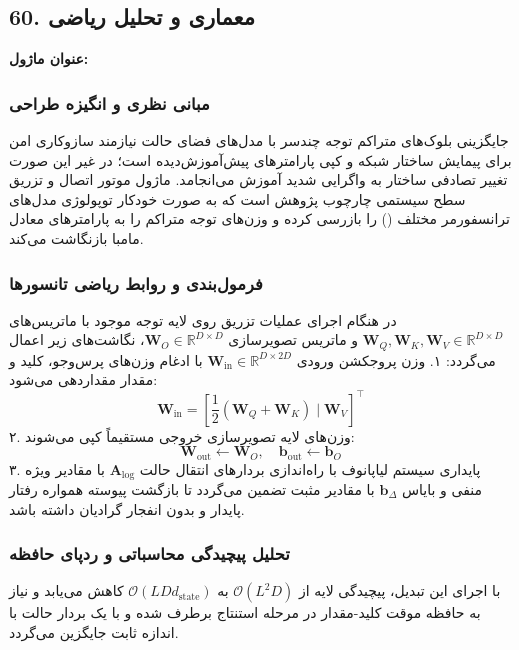 \subsection*{60. معماری و تحلیل ریاضی }
\textbf{عنوان ماژول:} 

\subsubsection*{مبانی نظری و انگیزه طراحی}
جایگزینی بلوک‌های متراکم توجه چندسر با مدل‌های فضای حالت نیازمند سازوکاری امن برای پیمایش ساختار شبکه و کپی پارامترهای پیش‌آموزش‌دیده است؛ در غیر این صورت تغییر تصادفی ساختار به واگرایی شدید آموزش می‌انجامد. ماژول  موتور اتصال و تزریق سطح سیستمی چارچوب پژوهش است که به صورت خودکار توپولوژی مدل‌های ترانسفورمر مختلف () را بازرسی کرده و وزن‌های توجه متراکم را به پارامترهای معادل مامبا بازنگاشت می‌کند.

\subsubsection*{فرمول‌بندی و روابط ریاضی تانسورها}
در هنگام اجرای عملیات تزریق روی لایه توجه موجود با ماتریس‌های $\mathbf{W}_Q, \mathbf{W}_K, \mathbf{W}_V \in \mathbb{R}^{D \times D}$ و ماتریس تصویرسازی $\mathbf{W}_O \in \mathbb{R}^{D \times D}$، نگاشت‌های زیر اعمال می‌گردد:
۱. وزن پروجکشن ورودی $\mathbf{W}_{\text{in}} \in \mathbb{R}^{D \times 2D}$ با ادغام وزن‌های پرس‌وجو، کلید و مقدار مقداردهی می‌شود:
\begin{equation}
\mathbf{W}_{\text{in}} = \left[ \frac{1}{2}(\mathbf{W}_Q + \mathbf{W}_K) \;\Big|\; \mathbf{W}_V \right]^\top
\end{equation}
۲. وزن‌های لایه تصویرسازی خروجی مستقیماً کپی می‌شوند:
\begin{equation}
\mathbf{W}_{\text{out}} \leftarrow \mathbf{W}_O, \quad \mathbf{b}_{\text{out}} \leftarrow \mathbf{b}_O
\end{equation}
۳. پایداری سیستم لیاپانوف با راه‌اندازی بردارهای انتقال حالت $\mathbf{A}_{\text{log}}$ با مقادیر ویژه منفی و بایاس $\mathbf{b}_\Delta$ با مقادیر مثبت تضمین می‌گردد تا بازگشت پیوسته همواره رفتار پایدار و بدون انفجار گرادیان داشته باشد.

\subsubsection*{تحلیل پیچیدگی محاسباتی و ردپای حافظه}
با اجرای این تبدیل، پیچیدگی لایه از $\mathcal{O}(L^2 D)$ به $\mathcal{O}(L D d_{\text{state}})$ کاهش می‌یابد و نیاز به حافظه موقت کلید-مقدار در مرحله استنتاج برطرف شده و با یک بردار حالت با اندازه ثابت جایگزین می‌گردد.


